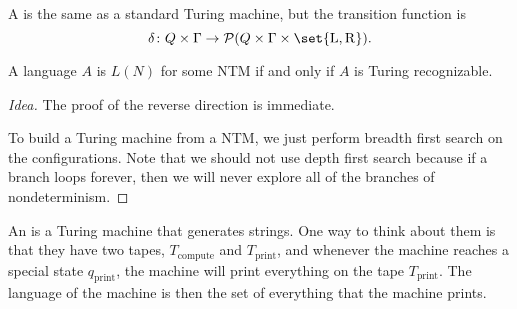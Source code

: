 \documentclass{standalone}
\begin{document}
\begin{definition}
	A 
  is the same as a standard Turing machine, but the transition function is
	\[
		\delta \colon Q \times \Gamma
           \to \mathcal{P}(Q \times \Gamma \times \set{\mathrm L, \mathrm R}).
	\]
\end{definition}

\begin{proposition}
	A language \(A\) is \(L(N)\) for some \textsf{NTM}
  if and only if \(A\) is Turing recognizable.
\end{proposition}
\begin{proof}[Idea]
	The proof of the reverse direction is immediate.

	To build a Turing machine from a \textsf{NTM},
  we just perform breadth first search on the configurations.
  Note that we should not use depth first search because
  if a branch loops forever,
  then we will never explore all of the branches of nondeterminism.
\end{proof}

\begin{definition}
	An  is a Turing machine that generates strings.
  One way to think about them is that they have two tapes,
  \(T_{\text{compute}}\) and \(T_{\text{print}}\),
  and whenever the machine reaches a special state \(q_{\text{print}}\),
  the machine will print everything on the tape \(T_{\text{print}}\).
  The language of the machine is then
  the set of everything that the machine prints.
\end{definition}
\end{document}
